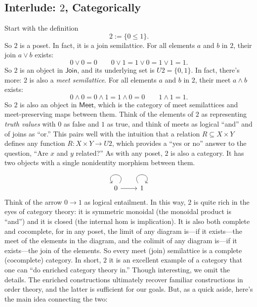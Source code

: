 \subsection{Interlude: $2$, Categorically}\label{digression:2}
Start with the definition
\[2:=\{0\leq 1\}.\]
So $2$ is a poset. In fact, it is a join semilattice. For all elements $a$ and $b$ in $2$, their join $a\vee b$ exists:
\[0\vee 0 = 0 \qquad 0\vee 1 = 1\vee 0 =  1\vee 1 = 1.\]
So $2$ is an object in $\mathsf{Join}$, and its underlying set is $U2=\{0,1\}$. In fact, there's more: $2$ is also a \emph{meet semilattice}. For all elements $a$ and $b$ in $2$, their meet $a\wedge b$ exists:
\[0\wedge 0 = 0\wedge 1 = 1\wedge 0 = 0 \qquad 1\wedge 1 = 1.\]
So $2$ is also an object in $\mathsf{Meet}$, which is the category of meet semilattices and meet-preserving maps between them. Think of the elements of $2$ as representing \emph{truth values} with $0$ as false and $1$ as true, and think of meets as logical ``and'' and of joins as ``or.'' This pairs well with the intuition that a relation $R\subseteq X\times Y$ defines any function $R\colon X\times Y\to U2$, which provides a ``yes or no'' answer to the question, ``Are $x$ and $y$ related?'' As with any poset, $2$ is also a category. It has two objects with a single nonidentity morphism between them.
\[
  \begin{tikzcd}
  0 \arrow[r] \arrow[loop, distance=2em, in=125, out=55] & 1 \arrow[loop, distance=2em, in=55, out=125]
  \end{tikzcd}
\]
Think of the arrow $0\to 1$ as logical entailment. In this way, $2$ is quite rich in the eyes of category theory: it is symmetric monoidal (the monoidal product is ``and'') and it is closed (the internal hom is implication). It is also both complete and cocomplete, for in any poset, the limit of any diagram is---if it exists---the meet of the elements in the diagram, and the colimit of any diagram is---if it exists---the join of the elements. So every meet (join) semilattice is a complete (cocomplete) category. In short, $2$ it is an excellent example of a category that one can ``do enriched category theory in.'' Though interesting, we omit the details. The enriched constructions ultimately recover familiar constructions in order theory, and the latter is sufficient for our goals. But, as a quick aside, here's the main idea connecting the two:
